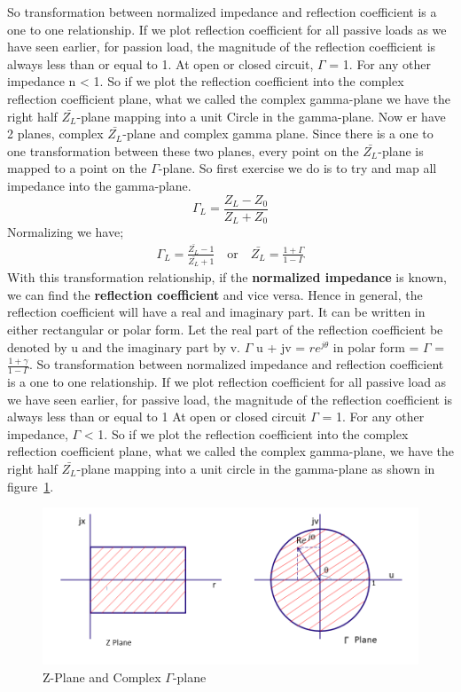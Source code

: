 So transformation between normalized impedance and reflection coefficient is a one to one relationship. If we plot reflection coefficient for all passive loads as we have seen earlier, for passion load, the magnitude of the reflection coefficient is always less than or equal to 1. At open or closed circuit, $\Gamma$ = 1. For any other impedance n < 1. So if we plot the reflection coefficient into the complex reflection coefficient plane, what we called the complex gamma-plane we have the right half $\bar{Z_L}$-plane mapping into a unit Circle in the gamma-plane. Now er have 2 planes, complex $\bar{Z_L}$-plane and complex gamma plane. Since there is a one to one transformation between these two planes, every point on the $\bar{Z_L}$-plane is mapped to a point on the $\Gamma$-plane. So first exercise we do is to try and map all impedance into the gamma-plane.
\begin{equation}
\Gamma_L = \frac{Z_L - Z_0}{Z_L + Z_0}\label{eqn:refcoefficientfromload07}
\end{equation}
Normalizing we have;
\begin{align*}
\Gamma_L = \frac{\bar{Z_L} - 1}{\bar{Z_L} + 1}\quad\text{or}\quad\bar{Z_L}= \frac{1 + \Gamma}{1 - \Gamma}
\end{align*}
With this transformation relationship, if the \textbf{normalized impedance} is known, we can find the \textbf{reflection coefficient} and vice versa. Hence in general, the reflection coefficient will have a real and imaginary part. It can be written in either rectangular or polar form. Let the real part of the reflection coefficient be denoted by u and the imaginary part by v. $\Gamma$ u + jv = $re^{j\theta}$ in polar form = $\Gamma$ = $\frac{1 + \gamma}{1-\Gamma}$. So transformation between normalized impedance and reflection coefficient is a one to one relationship. If we plot reflection coefficient for all passive load as we have seen earlier, for passive load, the magnitude of the reflection coefficient is always less than or equal to 1 At open or closed circuit $\Gamma$ = 1. For any other impedance, $\Gamma$ < 1. So if we plot the reflection coefficient into the complex reflection coefficient plane, what we called the complex gamma-plane, we have the right half $\bar{Z_L}$-plane mapping into a unit circle in the gamma-plane  as shown in figure~\ref{fig:oiuhgvcx}.
\begin{figure}[h]
\centering
\includegraphics[width=1.05\linewidth]{graphics/plane_transform}
\caption{Z-Plane and Complex $\Gamma$-plane}
\label{fig:oiuhgvcx}
\end{figure}

